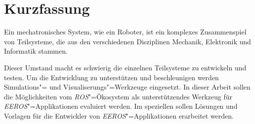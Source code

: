 \chapter*{Kurzfassung}



Ein mechatronisches System, wie ein Roboter, ist ein komplexes Zusammenspiel von Teilsysteme, die aus den verschiedenen Disziplinen Mechanik, Elektronik und Informatik stammen.




Dieser Umstand macht es schwierig die einzelnen Teilsysteme zu entwickeln und testen.
Um die Entwicklung zu unterstützen und beschleunigen werden Simulations"= und Visualiserungs"=Werkzeuge eingesetzt.
In dieser Arbeit sollen die Möglichkeiten vom \textit{ROS}"=Ökosystem als unterstützendes Werkzeug für \textit{EEROS}"=Applikationen evaluiert werden.
Im speziellen sollen Lösungen und Vorlagen für die Entwickler von \textit{EEROS}"=Applikationen erarbeitet werden.



